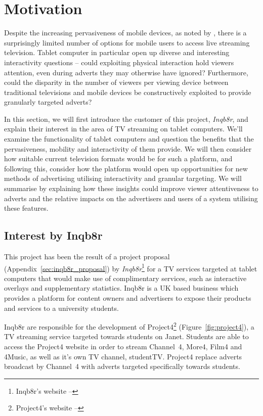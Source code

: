 \section{Motivation}

Despite the increasing pervasiveness of mobile devices, as noted by \citet{socialTV}, there is a surprisingly limited number of options for mobile users to access live streaming television. Tablet computer in particular open up diverse and interesting interactivity questions -- could exploiting physical interaction hold viewers attention, even during adverts they may otherwise have ignored? Furthermore, could the disparity in the number of viewers per viewing device between traditional televisions and mobile devices be constructively exploited to provide granularly targeted adverts?

In this section, we will first introduce the customer of this project, \textit{Inqb8r}, and explain their interest in the area of TV streaming on tablet computers. We'll examine the functionality of tablet computers and question the benefits that the pervasiveness, mobility and interactivity of them provide. We will then consider how suitable current television formats would be for such a platform, and following this, consider how the platform would open up opportunities for new methods of advertising utilising interactivity and granular targeting. We will summarise by explaining how these insights could improve viewer attentiveness to adverts and the relative impacts on the advertisers and users of a system utilising these features.


\subsection{Interest by Inqb8r}

	This project has been the result of a project proposal (Appendix~\ref{sec:inqb8r_proposal}) by \textit{Inqb8r}\footnote{Inqb8r's website -- } for a TV services targeted at tablet computers that would make use of complimentary services, such as interactive overlays and supplementary statistics. Inqb8r is a UK based business which provides a platform for content owners and advertisers to expose their products and services to a university students.

	Inqb8r are responsible for the development of Project4\footnote{Project4's website -- } (Figure~\ref{fig:project4}), a TV streaming service targeted towards students on Janet. Students are able to access the Project4 website in order to stream Channel~4, More4, Film4 and 4Music, as well as it's own TV channel, studentTV. Project4 replace adverts broadcast by Channel~4 with adverts targeted specifically towards students.
	
